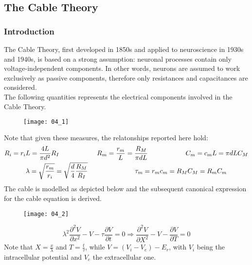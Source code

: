 \subsection{The Cable Theory}
\subsubsection{Introduction}
The Cable Theory, first developed in 1850s and applied to neuroscience in 1930s and 1940s,
is based on a strong assumption: neuronal processes contain only voltage-independent
components. In other words, neurons are assumed to work exclusively as passive components,
therefore only resistances and capacitances are considered.\\
The following quantities represents the electrical components involved in the Cable Theory.
\begin{figure}[H]
    \texttt{[image: 04\_1]}
    \centering
\end{figure}
Note that given these measures, the relatonships reported here hold:
\begin{gather*}
    R_{i}=r_{i}L=\frac{4L}{\pi{d^2}}R_{I}
    \hspace{2cm}
    R_{m}=\frac{r_{m}}{L}=\frac{R_{M}}{\pi{dL}}
    \hspace{2cm}
    C_{m}=c_{m}L=\pi{dLC_{M}}\\
    \lambda=\sqrt{\frac{r_{m}}{r_{i}}}=\sqrt{\frac{d}{4}\frac{R_{M}}{R_{I}}}
    \hspace{2.5cm}
    \tau_{m}=r_{m}c_{m}=R_{M}C_{M}=R_{m}C_{m}
\end{gather*}
The cable is modelled as depicted below and the subsequent canonical expression for
the cable equation is derived.
\begin{figure}[H]
    \texttt{[image: 04\_2]}
    \centering
\end{figure}
\begin{equation*}
    \lambda^{2}\frac{\partial^{2}V}{\partial{x^{2}}}-V-\tau{\frac{\partial{V}}{\partial{t}}}=0
    \Rightarrow
    \frac{\partial^{2}V}{\partial{X^{2}}}-V-\frac{\partial{V}}{\partial{T}}=0
\end{equation*}
Note that \(X=\frac{x}{\lambda}\) and \(T=\frac{t}{\tau}\), while \(V=(V_{i}-V_{e})-E_{r}\), with
\(V_i\) being the intracellular potential and \(V_e\) the extracellular one.
